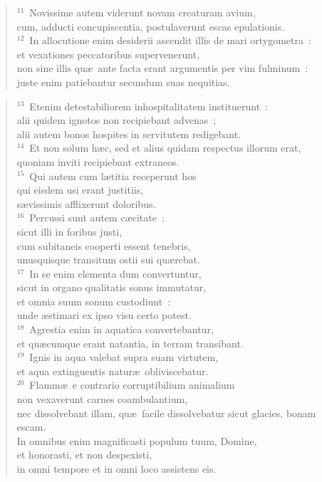 \begin{verse}
${}^{11}$~Novissime autem viderunt novam creaturam avium,\\ cum, adducti concupiscentia, postulaverunt escas epulationis.\\
${}^{12}$~In allocutione enim desiderii ascendit illis de mari ortygometra~:\\ et vexationes peccatoribus supervenerunt,\\ non sine illis qu\ae\ ante facta erant argumentis per vim fulminum~:\\ juste enim patiebantur secundum suas nequitias.\end{verse}


\begin{verse}${}^{13}$~Etenim detestabiliorem inhospitalitatem instituerunt~:\\ alii quidem ignotos non recipiebant advenas~;\\ alii autem bonos hospites in servitutem redigebant.\\
${}^{14}$~Et non solum h\ae c, sed et alius quidam respectus illorum erat,\\ quoniam inviti recipiebant extraneos.\\
${}^{15}$~Qui autem cum l\ae titia receperunt hos\\ qui eisdem usi erant justitiis,\\ s\ae vissimis afflixerunt doloribus.\\
${}^{16}$~Percussi sunt autem c\ae citate~:\\ sicut illi in foribus justi,\\ cum subitaneis cooperti essent tenebris,\\ unusquisque transitum ostii sui qu\ae rebat.\\
${}^{17}$~In se enim elementa dum convertuntur,\\ sicut in organo qualitatis sonus immutatur,\\ et omnia suum sonum custodiunt~:\\ unde \ae stimari ex ipso visu certo potest.\\
${}^{18}$~Agrestia enim in aquatica convertebantur,\\ et qu\ae cumque erant natantia, in terram transibant.\\
${}^{19}$~Ignis in aqua valebat supra suam virtutem,\\ et aqua extinguentis natur\ae\ obliviscebatur.\\
${}^{20}$~Flamm\ae\ e contrario corruptibilium animalium\\ non vexaverunt carnes coambulantium,\\ nec dissolvebant illam, qu\ae\ facile dissolvebatur sicut glacies, bonam escam.\\ In omnibus enim magnificasti populum tuum, Domine,\\ et honorasti, et non despexisti,\\ in omni tempore et in omni loco assistens eis.\end{verse}


